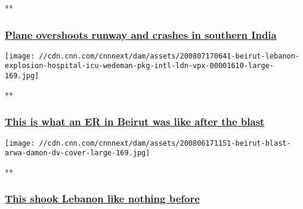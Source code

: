 **

\hypertarget{plane-overshoots-runway-and-crashes-in-southern-india-1}{%
\subsubsection{\texorpdfstring{\href{/videos/world/2020/08/07/plane-crash-kozhikode-international-airport-air-india-express-vedika-sud-intl-vpx.cnn/video/playlists/around-the-world/}{Plane
overshoots runway and crashes in southern
India}}{Plane overshoots runway and crashes in southern India}}\label{plane-overshoots-runway-and-crashes-in-southern-india-1}}

\href{/videos/world/2020/08/07/beirut-lebanon-explosion-hospital-icu-wedeman-pkg-intl-ldn-vpx.cnn/video/playlists/around-the-world/}{}

\texttt{[image: //cdn.cnn.com/cnnnext/dam/assets/200807170641-beirut-lebanon-explosion-hospital-icu-wedeman-pkg-intl-ldn-vpx-00001610-large-169.jpg]}

**

\hypertarget{this-is-what-an-er-in-beirut-was-like-after-the-blast}{%
\subsubsection{\texorpdfstring{\href{/videos/world/2020/08/07/beirut-lebanon-explosion-hospital-icu-wedeman-pkg-intl-ldn-vpx.cnn/video/playlists/around-the-world/}{This
is what an ER in Beirut was like after the
blast}}{This is what an ER in Beirut was like after the blast}}\label{this-is-what-an-er-in-beirut-was-like-after-the-blast}}

\href{/videos/world/2020/08/06/beirut-explosion-arwa-damon-lon-orig.cnn/video/playlists/around-the-world/}{}

\texttt{[image: //cdn.cnn.com/cnnnext/dam/assets/200806171151-beirut-blast-arwa-damon-dv-cover-large-169.jpg]}

**

\hypertarget{this-shook-lebanon-like-nothing-before}{%
\subsubsection{\texorpdfstring{\href{/videos/world/2020/08/06/beirut-explosion-arwa-damon-lon-orig.cnn/video/playlists/around-the-world/}{This
shook Lebanon like nothing
before}}{This shook Lebanon like nothing before}}\label{this-shook-lebanon-like-nothing-before}}

\href{/videos/world/2020/08/06/emmanuel-macron-lebanon-leaders-blank-check-sot-vpx.afptv/video/playlists/around-the-world/}{}

